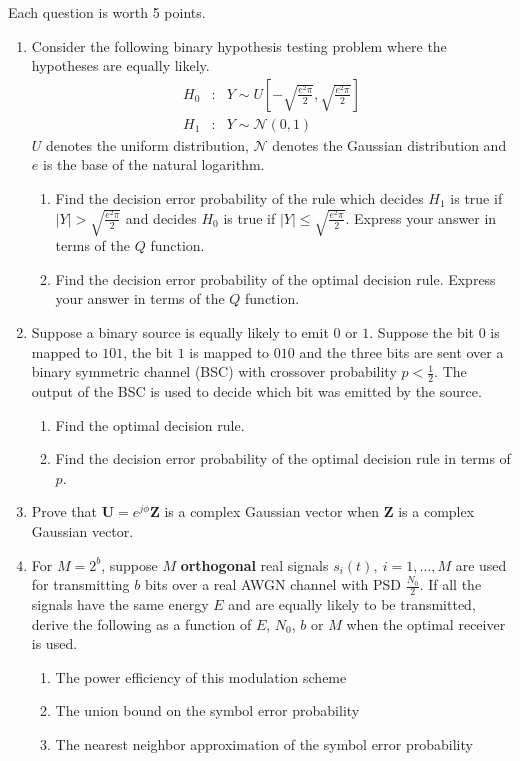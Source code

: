 \documentclass[10pt]{report}
\begin{document}
Each question is worth 5 points.
\begin{enumerate}
  \item Consider the following binary hypothesis testing problem where the hypotheses are equally likely.
    \begin{eqnarray*}
      H_0 & : & Y \sim U\left[ -\sqrt{\frac{e^2\pi}{2}}, \sqrt{\frac{e^2\pi}{2}} \right] \\
      H_1 & : & Y \sim \mathcal{N}(0,1)
    \end{eqnarray*}
    $U$ denotes the uniform distribution, $\mathcal{N}$ denotes the Gaussian distribution and $e$ is the base of the natural logarithm.
    \begin{enumerate}
      \item Find the decision error probability of the rule which decides $H_1$ is true if $\lvert Y \rvert > \sqrt{\frac{e^2\pi}{2}}$ and decides $H_0$ is true if $\lvert Y \rvert \leq \sqrt{\frac{e^2\pi}{2}}$. Express your answer in terms of the $Q$ function.
      \item Find the decision error probability of the optimal decision rule. Express your answer in terms of the $Q$ function.
    \end{enumerate}

  \item Suppose a binary source is equally likely to emit $0$ or $1$. Suppose the bit $0$ is mapped to $101$, the bit $1$ is mapped to $010$ and the three bits are sent over a binary symmetric channel (BSC) with crossover probability $p < \frac{1}{2}$. The output of the BSC is used to decide which bit was emitted by the source.
    \begin{enumerate}
      \item Find the optimal decision rule.
      \item Find the decision error probability of the optimal decision rule in terms of $p$.
    \end{enumerate}

  \item Prove that $\mathbf{U} = e^{j\phi}\mathbf{Z}$ is a complex Gaussian vector when $\mathbf{Z}$ is a complex Gaussian vector.

  \item For $M = 2^b$, suppose $M$ \textbf{orthogonal} real signals $s_i(t), \ i = 1,\ldots,M$ are used for transmitting $b$ bits over a real AWGN channel with PSD $\frac{N_0}{2}$. If all the signals have the same energy $E$ and are equally likely to be transmitted, derive the following as a function of $E$, $N_0$, $b$ or $M$ when the optimal receiver is used.
  \begin{enumerate}
    \item The power efficiency of this modulation scheme
    \item The union bound on the symbol error probability
    \item The nearest neighbor approximation of the symbol error probability
  \end{enumerate}


\end{enumerate}
\end{document}
